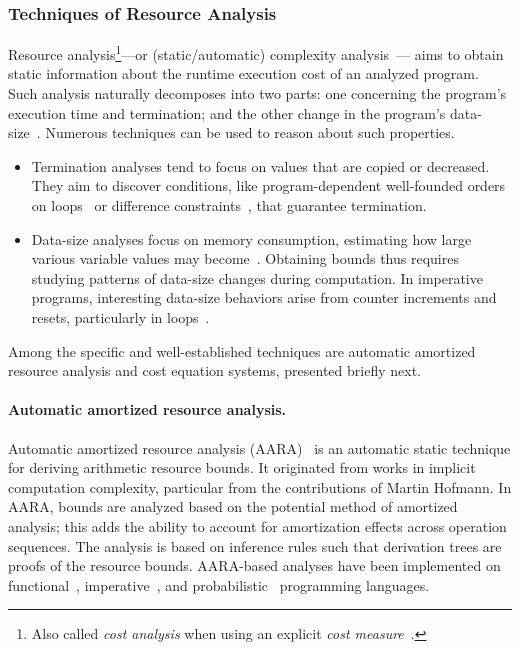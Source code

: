 \subsubsection{Techniques of Resource Analysis}\label{resource-analysis}

Resource analysis\footnote{
Also called \emph{cost analysis} when using an explicit \emph{cost measure}~\cite{albert2008}.
}---or (static/automatic) {complexity analysis}~\cite{rosendahl1989,leivant2013}---%
aims to obtain static information about the runtime {execution cost} of an analyzed program.
Such analysis naturally decomposes into two parts: one concerning the program's execution time and termination;
and the other change in the program's data-size~\cite{jones2009}.
Numerous techniques can be used to reason about such properties.

\begin{itemize}
\item Termination analyses tend to focus on values that are copied or decreased.
      They aim to discover conditions, like program-dependent well-founded orders on loops~\cite{lee2001} or difference constraints~\cite{sinn2017},
      that guarantee termination.
\item Data-size analyses focus on memory consumption, estimating how large various variable values may become~\cite{lommen2023}.
      Obtaining bounds thus requires studying patterns of data-size changes during computation.
      In imperative programs, interesting data-size behaviors arise from counter increments and resets, particularly in loops~\cite{sinn2017,benamram2020}.
\end{itemize}

Among the specific and well-established techniques are automatic amortized resource analysis and cost equation systems, presented briefly next.

\paragraph*{Automatic amortized resource analysis.}
Automatic amortized resource analysis (AARA)~\cite{hoffmann2022} is an automatic static technique for deriving arithmetic resource bounds.
It originated from works in implicit computation complexity, particular from the contributions of Martin Hofmann.
In AARA, bounds are analyzed based on the potential method of amortized analysis;
this adds the ability to account for amortization effects across operation sequences.
The analysis is based on inference rules such that derivation trees are proofs of the resource bounds.
AARA-based analyses have been implemented on functional~\cite{hoffmann2017}, imperative~\cite{carbonneaux2015,carbonneaux2017},
and probabilistic~\cite{ngo2018} programming languages.


